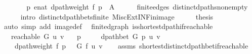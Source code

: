 \begin{isabellebody}
\ \ \isamarkupfalse%
\ \isamarkupfalse%
\ {\isachardoublequoteopen}{\isachardot}{\kern0pt}{\isachardot}{\kern0pt}{\isachardot}{\kern0pt}\ {\isasymin}\ {\isacharparenleft}{\kern0pt}{\isasymlambda}p{\isachardot}{\kern0pt}\ enat\ {\isacharparenleft}{\kern0pt}dpath{\isacharunderscore}{\kern0pt}weight\ f\ p{\isacharparenright}{\kern0pt}{\isacharparenright}{\kern0pt}\ {\isacharbackquote}{\kern0pt}\ {\isacharquery}{\kern0pt}A{\isachardoublequoteclose}\isanewline
\ \ \ \ \isamarkupfalse%
\ finite{\isacharunderscore}{\kern0pt}edges\ distinct{\isacharunderscore}{\kern0pt}dpaths{\isacharunderscore}{\kern0pt}non{\isacharunderscore}{\kern0pt}empty\isanewline
\ \ \ \ \isamarkupfalse%
\ {\isacharparenleft}{\kern0pt}intro\ distinct{\isacharunderscore}{\kern0pt}dpath{\isacharunderscore}{\kern0pt}bets{\isacharunderscore}{\kern0pt}finite\ Misc{\isacharunderscore}{\kern0pt}Ext{\isachardot}{\kern0pt}INF{\isacharunderscore}{\kern0pt}in{\isacharunderscore}{\kern0pt}image{\isacharparenright}{\kern0pt}\isanewline
\ \ \isamarkupfalse%
\ \isamarkupfalse%
\ {\isacharquery}{\kern0pt}thesis\isanewline
\ \ \ \ \isamarkupfalse%
\ {\isacharparenleft}{\kern0pt}auto\ simp\ add{\isacharcolon}{\kern0pt}\ image{\isacharunderscore}{\kern0pt}def{\isacharparenright}{\kern0pt}\isanewline
{}\isamarkupfalse%
%
\endisatagproof
{\isafoldproof}%
%
\isadelimproof
\isanewline
%
\endisadelimproof
%
\isadeliminvisible
\isanewline
%
\endisadeliminvisible
%
\isataginvisible
{}\isamarkupfalse%
\ {\isacharparenleft}{\kern0pt}\ finite{\isacharunderscore}{\kern0pt}dgraph{\isacharparenright}{\kern0pt}\ is{\isacharunderscore}{\kern0pt}shortest{\isacharunderscore}{\kern0pt}dpath{\isacharunderscore}{\kern0pt}if{\isacharunderscore}{\kern0pt}reachable{\isacharcolon}{\kern0pt}\isanewline
\ \ \ {\isachardoublequoteopen}reachable\ G\ u\ v{\isachardoublequoteclose}\isanewline
\ \ \ p\ \isanewline
\ \ \ \ {\isachardoublequoteopen}dpath{\isacharunderscore}{\kern0pt}bet\ G\ p\ u\ v{\isachardoublequoteclose}\isanewline
\ \ \ \ {\isachardoublequoteopen}dpath{\isacharunderscore}{\kern0pt}weight\ f\ p\ {\isacharequal}{\kern0pt}\ {\isasymdelta}\ G\ f\ u\ v{\isachardoublequoteclose}%
\endisataginvisible
{\isafoldinvisible}%
%
\isadeliminvisible
\isanewline
%
\endisadeliminvisible
%
\isadelimproof
\ \ %
\endisadelimproof
%
\isatagproof
{}\isamarkupfalse%
\ assms\ shortest{\isacharunderscore}{\kern0pt}distinct{\isacharunderscore}{\kern0pt}dpath{\isacharunderscore}{\kern0pt}bet{\isacharunderscore}{\kern0pt}if{\isacharunderscore}{\kern0pt}reachable\isanewline

\end{isabellebody}
